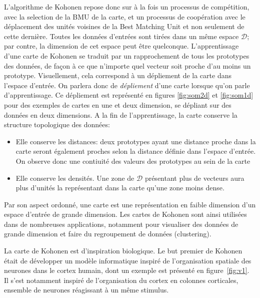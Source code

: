 \documentclass[../main]{subfiles}
\begin{document}
L'algorithme de Kohonen repose donc sur à la fois un processus de compétition, avec la selection de la BMU de la carte, et un processus de coopération avec le déplacement des unités voisines de la Best Matching Unit et non seulement de cette dernière.
Toutes les données d'entrées sont tirées dans un même espace $\mathcal{D}$; par contre, la dimension de cet espace peut être quelconque.
L'apprentissage d'une carte de Kohonen se traduit par un rapprochement de tous les prototypes des données, de façon à ce que n'importe quel vecteur soit proche d'au moins un prototype. Visuellement, cela correspond à un dépliement de la carte dans l'espace d'entrée. On parlera donc de \emph{dépliement} d'une carte lorsque qu'on parle d'apprentissage. Ce dépliement est représenté en figures \ref{fig:som2d} et \ref{fig:som1d} pour des exemples de cartes en une et deux dimension, se dépliant sur des données en deux dimensions. 
A la fin de l'apprentissage, la carte conserve la structure topologique des données:
\begin{itemize}
\item Elle conserve les distances: deux prototypes ayant une distance proche dans la carte seront également proches selon la distance définie dans l'espace d'entrée. On observe donc une contiuité des valeurs des prototypes au sein de la carte
\item Elle conserve les densités. Une zone de $\mathcal{D}$ présentant plus de vecteurs aura plus d'unités la représentant dans la carte qu'une zone moins dense.
\end{itemize}
Par son aspect ordonné, une carte est une représentation en faible dimension d'un espace d'entrée de grande dimension. Les cartes de Kohonen sont ainsi utilisées dans de nombreuses applications, notamment pour visualiser des données de grande dimension et faire du regroupement de données (clustering). 

La carte de Kohonen est d'inspiration biologique. Le but premier de Kohonen était de développer un modèle informatique inspiré de l'organisation spatiale des neurones dans le cortex humain, dont un exemple est présenté en figure~\ref{fig:v1}. Il s'est notamment inspiré de l'organisation du cortex en colonnes corticales, ensemble de neurones réagissant à un même stimulus.

\end{document}
